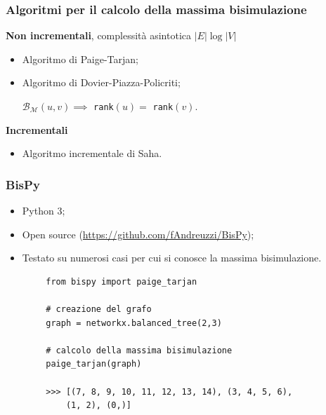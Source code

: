 \documentclass{beamer}
\begin{document}
\begin{frame}\frametitle{Algoritmi per il calcolo della massima bisimulazione}
    \textbf{Non incrementali}, complessità asintotica $|E| \log |V|$
    \begin{itemize}
        \item Algoritmo di Paige-Tarjan;
        \item Algoritmo di Dovier-Piazza-Policriti;

        \qquad $\mathcal{B}_\mathcal{M}(u,v) \implies$ \texttt{rank}$(u) =$ \texttt{rank}$(v)$.
    \end{itemize}

    \bigskip

    \textbf{Incrementali}
    \begin{itemize}
        \item Algoritmo incrementale di Saha.
    \end{itemize}
\end{frame}

\begin{frame}[fragile]\frametitle{BisPy}
    \begin{itemize}
        \item Python 3;
        \item Open source (\url{https://github.com/fAndreuzzi/BisPy});
        \item Testato su numerosi casi per cui si conosce la massima bisimulazione.
    \end{itemize}

    \begin{example}
        \begin{verbatim}
        from bispy import paige_tarjan

        # creazione del grafo
        graph = networkx.balanced_tree(2,3)

        # calcolo della massima bisimulazione
        paige_tarjan(graph)

        >>> [(7, 8, 9, 10, 11, 12, 13, 14), (3, 4, 5, 6),
            (1, 2), (0,)]
        \end{verbatim}
    \end{example}
\end{frame}
\end{document}
